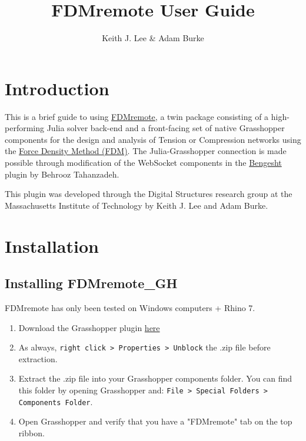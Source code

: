 \documentclass{ol-softwaremanual}
\title{FDMremote User Guide}
\author{Keith J. Lee \& Adam Burke}
\begin{document}
\maketitle

\tableofcontents
\newpage

\section{Introduction}
This is a brief guide to using \href{https://github.com/keithjlee/FDMremote_GH}{FDMremote}, a twin package consisting of a high-performing Julia solver back-end and a front-facing set of native Grasshopper components for the design and analysis of Tension or Compression networks using the \href{https://www.sciencedirect.com/science/article/abs/pii/0045782574900450}{Force Density Method (FDM)}. The Julia-Grasshopper connection is made possible through modification of the WebSocket components in 
 the \href{https://www.food4rhino.com/en/app/bengesht}{Bengesht} plugin by Behrooz Tahanzadeh.

This plugin was developed through the Digital Structures research group at the Massachusetts Institute of Technology by Keith J. Lee and Adam Burke. 

\section{Installation} \label{sec:installation}

\subsection{Installing FDMremote\_GH}
\begin{center}
    {\color{kpink} FDMremote has only been tested on Windows computers + Rhino 7.}
\end{center}

\begin{enumerate}
    \item Download the Grasshopper plugin \href{https://www.food4rhino.com/en/app/fdmremote?lang=en}{here}
    \item As always, \texttt{right click > Properties > Unblock} the .zip file before extraction.
    \item Extract the .zip file into your Grasshopper components folder. You can find this folder by opening Grasshopper and: \texttt{File > Special Folders > Components Folder}.
    \item Open Grasshopper and verify that you have a "FDMremote" tab on the top ribbon.
\end{enumerate}
\end{document}
